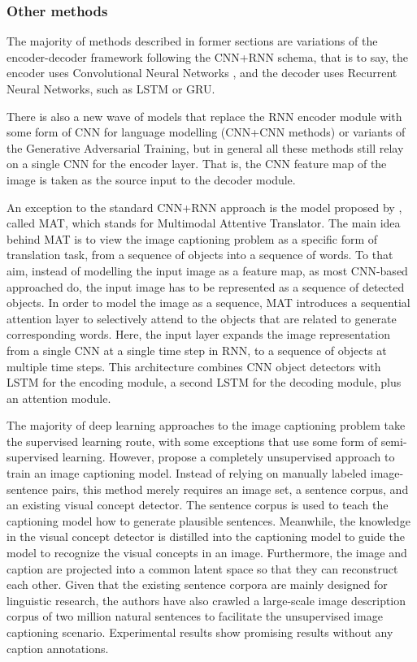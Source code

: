 \subsubsection{Other methods}

The majority of methods described in former sections are variations of the encoder-decoder framework following the CNN+RNN schema, that is to say, the encoder uses Convolutional Neural Networks \cite{Lecun1998}, and the decoder uses Recurrent Neural Networks, such as LSTM\citep{Hochreiter1997} or GRU\citep{Chung2014}.

There is also a new wave of models that replace the RNN encoder module with some form of CNN for language modelling (CNN+CNN methods) or variants of the Generative Adversarial Training, but in general all these methods still relay on a single CNN for the encoder layer. That is, the CNN feature map of the image is taken as the source input to the decoder module.

An exception to the standard CNN+RNN approach is the model proposed by \citet{Liu2017_MAT}, called MAT, which stands for Multimodal Attentive Translator. The main idea behind MAT is to view the image captioning problem as a specific form of translation task, from a sequence of objects into a sequence of words. To that aim, instead of modelling the input image as a feature map, as most CNN-based approached do, the input image has to be represented as a sequence of detected objects. In order to model the image as a sequence, MAT introduces a sequential attention layer to selectively attend to the objects that are related to generate corresponding words. Here, the input layer expands the image representation from a single CNN at a single time step in RNN, to a sequence of objects at multiple time steps. This architecture combines CNN object detectors with LSTM for the encoding module, a second  LSTM for the decoding module, plus an attention module.

The majority of deep learning approaches to the image captioning problem take the supervised learning route, with some exceptions that use some form of semi-supervised learning\citep{Pu2016_VAE, Anderson2018_SemiSup}. However, \citet{Feng2018} propose a completely unsupervised approach to train an image captioning model. Instead of relying on manually labeled image-sentence pairs, this method merely requires an image set, a sentence corpus, and an existing visual concept detector. The sentence corpus is used to teach the captioning model how to generate plausible sentences. Meanwhile, the knowledge in the visual concept detector is distilled into the captioning model to guide the model to recognize the visual concepts in an image. Furthermore, the image and caption are projected into a common latent space so that they can reconstruct each other. Given that the existing sentence corpora are mainly designed for linguistic research, the authors have also  crawled a large-scale image description corpus of two million natural sentences to facilitate the unsupervised image captioning scenario. Experimental results show promising results without any caption annotations.

